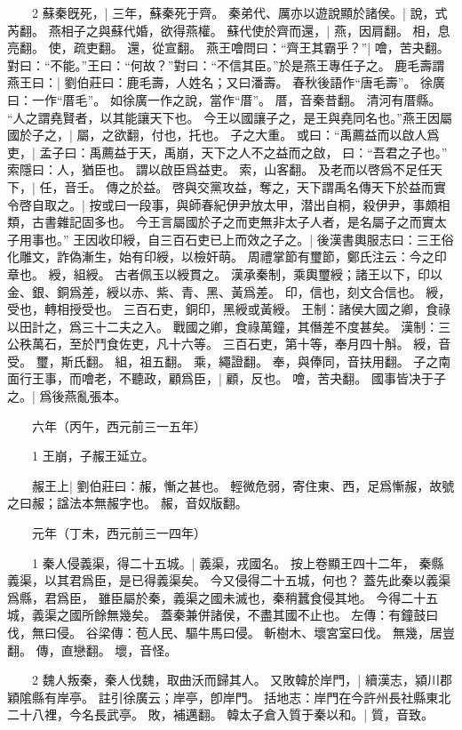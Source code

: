 　　2 蘇秦旣死，|{
	三年，蘇秦死于齊。
}
秦弟代、厲亦以遊說顯於諸侯。|{
	說，式芮翻。
}
燕相子之與蘇代婚，欲得燕權。
	蘇代使於齊而還，|{
	燕，因肩翻。
	相，息亮翻。
	使，疏吏翻。
	還，從宣翻。
}
燕王噲問曰：“齊王其霸乎？”|{
	噲，苦夬翻。
}
對曰：“不能。”王曰：“何故？”對曰：“不信其臣。”於是燕王專任子之。
	鹿毛壽謂燕王曰：|{
	劉伯莊曰：鹿毛壽，人姓名；又曰潘壽。
	春秋後語作“唐毛壽”。
	徐廣曰：一作“厝毛”。
	如徐廣一作之說，當作“厝”。
	厝，音秦昔翻。
	清河有厝縣。
}
“人之謂堯賢者，以其能讓天下也。
	今王以國讓子之，是王與堯同名也。”燕王因屬國於子之，|{
	屬，之欲翻，付也，托也。
}
子之大重。
	或曰：“禹薦益而以啟人爲吏，|{
	孟子曰：禹薦益于天，禹崩，天下之人不之益而之啟，
	曰：“吾君之子也。”
	索隱曰：人，猶臣也。
	謂以啟臣爲益吏。
	索，山客翻。
}
及老而以啓爲不足任天下，|{
	任，音壬。
}
傳之於益。
	啓與交黨攻益，奪之，天下謂禹名傳天下於益而實令啓自取之。|{
	按或曰一段事，與師春紀伊尹放太甲，潜出自桐，殺伊尹，事頗相類，古書雜記固多也。
}
今王言屬國於子之而吏無非太子人者，是名屬子之而實太子用事也。”
王因收印綬，自三百石吏已上而效之子之。|{
	後漢書輿服志曰：三王俗化雕文，詐偽漸生，始有印綬，以檢奸萌。
	周禮掌節有璽節，鄭氏注云：今之印章也。
	綬，組綬。
	古者佩玉以綬貫之。
	漢承秦制，乘輿璽綬；諸王以下，印以金、銀、銅爲差，綬以赤、紫、青、黑、黃爲差。
	印，信也，刻文合信也。
	綬，受也，轉相授受也。
	三百石吏，銅印，黑綬或黃綬。
	王制：諸侯大國之卿，食祿以田計之，爲三十二夫之入。
	戰國之卿，食祿萬鐘，其僭差不度甚矣。
	漢制：三公秩萬石，至於鬥食佐吏，凡十六等。
	三百石吏，第十等，奉月四十斛。
	綬，音受。
	璽，斯氏翻。
	組，祖五翻。
	乘，繩證翻。
	奉，與俸同，音扶用翻。
}
子之南面行王事，而噲老，不聽政，顧爲臣，|{
	顧，反也。
	噲，苦夬翻。
}
國事皆决于子之。|{
	爲後燕亂張本。
}

　　六年（丙午，西元前三一五年）

　　1 王崩，子赧王延立。


　　赧王上|{
	劉伯莊曰：赧，慚之甚也。
	輕微危弱，寄住東、西，足爲慚赧，故號之曰赧；諡法本無赧字也。
	赧，音奴版翻。
}

　　元年（丁未，西元前三一四年）

　　1 秦人侵義渠，得二十五城。|{
	義渠，戎國名。
	按上卷顯王四十二年，
	秦縣義渠，以其君爲臣，是已得義渠矣。
	今又侵得二十五城，何也？
	蓋先此秦以義渠爲縣，君爲臣，
	雖臣屬於秦，義渠之國未滅也，秦稍蠶食侵其地。
	今得二十五城，義渠之國所餘無幾矣。
	蓋秦兼併諸侯，不盡其國不止也。
	左傳：有鐘鼓曰伐，無曰侵。
	谷梁傳：苞人民、驅牛馬曰侵。
	斬樹木、壞宮室曰伐。
	無幾，居豈翻。
	傳，直戀翻。
	壞，音怪。
}

　　2 魏人叛秦，秦人伐魏，取曲沃而歸其人。
	又敗韓於岸門，|{
	續漢志，潁川郡穎隂縣有岸亭。
	註引徐廣云；岸亭，卽岸門。
	括地志：岸門在今許州長社縣東北二十八裡，今名長武亭。
	敗，補邁翻。
}
韓太子倉入質于秦以和。|{
	質，音致。
}

